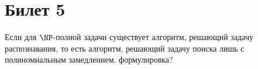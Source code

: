 \setcounter{section}{4}
\section{Билет 5}
	\begin{theorem}
		Если для $\NP$-полной задачи существует алгоритм, решающий задачу распознавания, то есть алгоритм, решающий задачу поиска лишь с полиномиальным замедлением.
		\TODO формулировка?
	\end{theorem}

